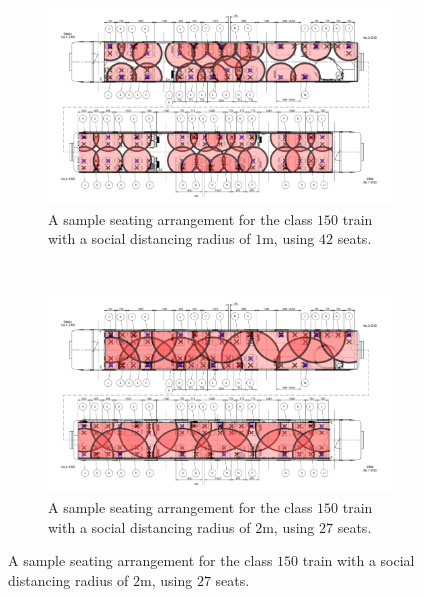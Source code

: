 \documentclass[11pt,a4paper]{article}
\begin{document}
\begin{figure}[ht!]
\centering

\vspace{-1.5cm}

\begin{subfigure}[h]{0.95\linewidth}
\centering
\includegraphics[width = \linewidth]{overlay_1m_tfw.png}
\caption{A sample seating arrangement for the class $150$ train with a social distancing radius of $1$m, using $42$ seats.}
\label{Reference}
\end{subfigure}
~
\begin{subfigure}[h]{0.95\linewidth}
\centering
\includegraphics[width = \linewidth]{overlay_2m_tfw.png}
\caption{A sample seating arrangement for the class $150$ train with a social distancing radius of $2$m, using $27$ seats.}
\label{OneMetre1}
\end{subfigure}

\end{figure}
\end{document}
